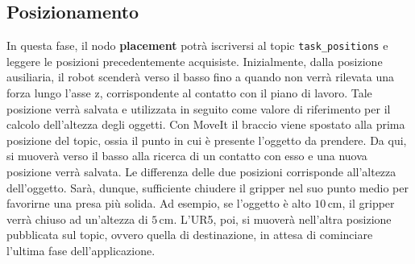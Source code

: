 \subsection{Posizionamento} \label{sub:placement}
In questa fase, il nodo \textbf{placement}\footnotemark{} potr\`{a} iscriversi al topic \verb|task_positions| e leggere le posizioni precedentemente 
acquisiste. Inizialmente, dalla posizione ausiliaria, il robot scender\`{a} verso il basso fino a quando non verr\`{a} rilevata 
una forza lungo l'asse z, corrispondente al contatto con il piano di lavoro. Tale posizione verr\`{a} salvata e utilizzata in seguito 
come valore di riferimento per il calcolo dell'altezza degli oggetti. 
Con MoveIt il braccio viene spostato alla prima posizione del topic, ossia il punto in cui \`{e} presente l'oggetto da prendere.
Da qui, si muover\`{a} verso il basso alla ricerca di un contatto con esso e una nuova posizione verr\`{a} salvata. 
Le differenza delle due posizioni corrisponde all'altezza dell'oggetto. Sar\`{a}, dunque, sufficiente chiudere il gripper 
nel suo punto medio per favorirne una presa pi\`{u} solida. Ad esempio, se l'oggetto \`{e} alto $10 \, \text{cm}$, il gripper verr\`{a} chiuso 
ad un'altezza di $5 \, \text{cm}$. 
L'UR5, poi, si muover\`{a} nell'altra posizione pubblicata sul topic, ovvero quella di destinazione, 
in attesa di cominciare l'ultima fase dell'applicazione.
